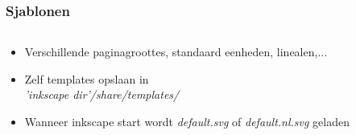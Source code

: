 \documentclass[t]{beamer}
\begin{document}
	\begin{frame}
		\frametitle{Sjablonen}
			\begin{columns}
				\begin{column}[T]{0.6\textwidth}
					\begin{itemize}
						\item Verschillende paginagroottes, standaard eenheden, linealen,...
					\end{itemize}
					\begin{itemize}
						\item Zelf templates opslaan in\\ \emph{'inkscape dir'/share/templates/}
						\item Wanneer inkscape start wordt \emph{default.svg} of \emph{default.nl.svg} geladen
					\end{itemize}
					

\end{column}
\end{columns}
\end{frame}
\end{document}
